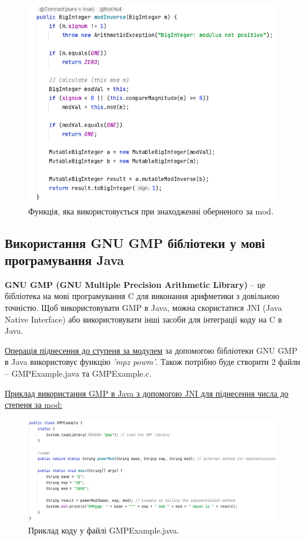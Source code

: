 \begin{figure}[h]
     \centering
     \includegraphics[scale = 0.49]{../IMAGES/Java/BigInt_Inv_doc.png}
     \caption{\large{Функція, яка використовується при знаходженні оберненого за mod.}}
     \label{fig_java_Inv3}
\end{figure}

\subsection{Використання GNU GMP бібліотеки у мові програмування Java}

\textbf{GNU GMP (GNU Multiple Precision Arithmetic Library)} -- це бібліотека на мові програмування C для виконання арифметики з довільною точністю. Щоб використовувати GMP в Java, можна скористатися JNI (Java Native Interface) або використовувати інші засоби для інтеграції коду на C в Java.

\uline{Операція піднесення до ступеня за модулем} за допомогою бібліотеки GNU GMP в Java використовує функцію \textit{'mpz powm'}. Також потрібно буде створити 2 файли -- GMPExample.java та GMPExample.c.

\uline{Приклад використання GMP в Java з допомогою JNI для піднесення числа до степеня за mod:}

\begin{figure}[h]
     \centering
     \includegraphics[scale = 0.5]{../IMAGES/Java/GMP_modPow_ex.png}
     \caption{Приклад коду у файлі GMPExample.java.}
     \label{fig_java_GMPpow_java}
\end{figure}

